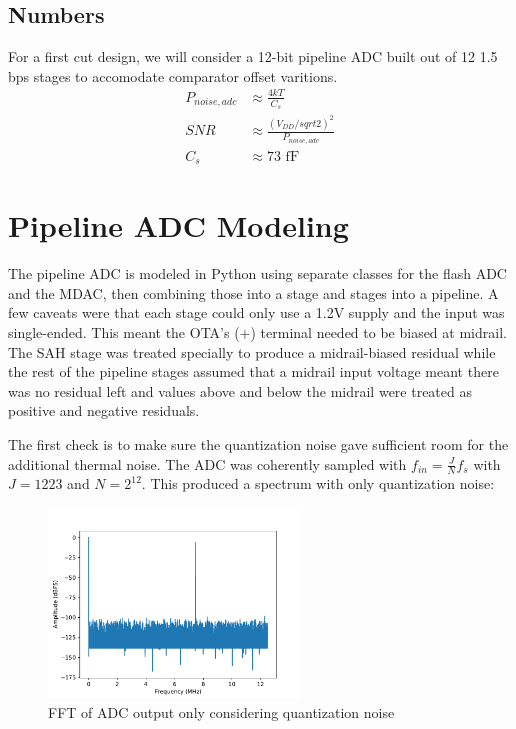 \documentclass[11pt]{article}
\begin{document}
\subsection{Numbers}
For a first cut design, we will consider a 12-bit pipeline ADC built out of 12 1.5 bps stages to accomodate comparator offset varitions.
\begin{align*}
  P_{noise,adc} &\approx \frac{4kT}{C_s} \\
  SNR &\approx \frac{(V_{DD} / sqrt{2})^2}{P_{noise,adc}} \\
  C_s &\approx 73 \text{ fF}
\end{align*}

\section{Pipeline ADC Modeling}
The pipeline ADC is modeled in Python using separate classes for the flash ADC and the MDAC, then combining those into a stage and stages into a pipeline.
A few caveats were that each stage could only use a 1.2V supply and the input was single-ended.
This meant the OTA's (+) terminal needed to be biased at midrail.
The SAH stage was treated specially to produce a midrail-biased residual while the rest of the pipeline stages assumed that a midrail input voltage meant there was no residual left and values above and below the midrail were treated as positive and negative residuals.

The first check is to make sure the quantization noise gave sufficient room for the additional thermal noise.
The ADC was coherently sampled with $f_{in} = \frac{J}{N} f_s$ with $J = 1223$ and $N = 2^{12}$.
This produced a spectrum with only quantization noise:
\begin{figure}[h]
  \centering
  \includegraphics[width=0.6\textwidth]{figs/spectrum_quant_only.pdf}
  \caption{FFT of ADC output only considering quantization noise}
\end{figure}
\end{document}
